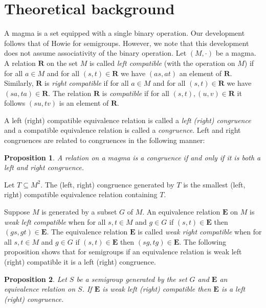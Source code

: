 \documentclass{acmconf}
\newtheorem{proposition}{Proposition}
\begin{document}
\section{Theoretical background} \label{S:theory}
A magma is a set equipped with a single binary operation. 
Our development follows that of Howie \cite{bH76} for semigroups. However,
we note that this development does not assume associativity 
of the binary operation.
Let $(M,\cdot)$ be a 
magma. A relation $\mathbf R$ on the set $M$ is called 
\emph{left compatible} (with the operation on $M$) if
for all $a\in M$ and for all $(s,t)\in \mathbf R$ we have  
$(as,at)$ an element of $\mathbf R$. Similarly,
$\mathbf R$ is \emph{right compatible} if for all $a\in M$ and
for all $(s,t)\in\mathbf R$ we have $(sa,ta)\in\mathbf R$.
The relation $\mathbf R$ is \emph{compatible}
if for all $(s,t),(u,v)\in \mathbf R$ it follows
$(su,tv)$ is an element of $\mathbf R$. 

A left (right) compatible equivalence relation is called a 
\emph{left (right) congruence} and a compatible equivalence relation
is called a \emph{congruence}. 
Left and right congruences are related to
congruences in the following manner:

\begin{proposition} \label{P:a}
A relation on a magma is a congruence if and only if
it is both a left and right congruence.
\end{proposition}

Let $T\subseteq M^2$. The (left, right) 
congruence generated by
$T$ is the smallest (left, right) compatible equivalence relation 
containing $T$. 

Suppose $M$ is generated by a subset $G$ of $M$. An
equivalence relation
$\mathbf E$ on $M$ is \emph{weak left compatible} when for all
$s,t\in M$ and $g\in G$ if $(s,t)\in \mathbf E$ then 
$(gs,gt)\in \mathbf E$. The equivalence relation $\mathbf E$
is called \emph{weak right compatible}
when for all $s,t\in M$ and $g\in G$ if $(s,t)\in \mathbf E$ then
$(sg,tg)\in \mathbf E$.
The following proposition shows that for semigroups if an 
equivalence relation is weak left (right) 
compatible it is a left (right) congruence. 

\begin{proposition} \label{P:b}
Let $S$ be a semigroup generated by the set $G$ and 
$\mathbf E$ an equivalence relation on $S$.
If $\mathbf E$ is weak left (right) compatible then 
$\mathbf E$ is a left (right) congruence.
\end{proposition}
\end{document}
